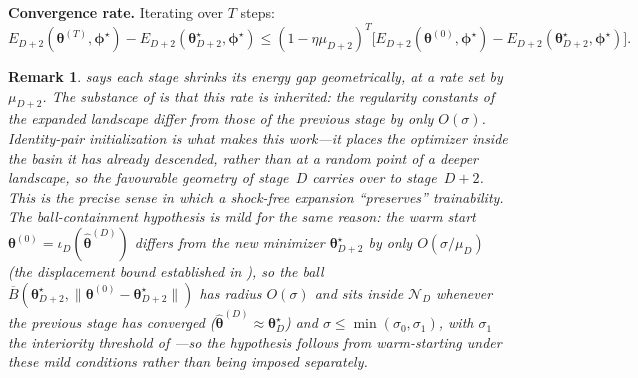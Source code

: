 \documentclass[11pt]{article}
\newcommand{\cN}{\mathcal{N}}
\theoremstyle{plain}
\theoremstyle{plain}
\newtheorem{remark}[theorem]{Remark}
\begin{document}
\medskip\noindent\textbf{Convergence rate.}
Iterating over $T$ steps:
\begin{equation}\label{eq:T_step_convergence}
  E_{D+2}(\bm\theta^{(T)},\bm\phi^\star)-E_{D+2}(\bm\theta_{D+2}^\star,\bm\phi^\star)
  \le(1-\eta\mu_{D+2})^T
   \bigl[E_{D+2}(\bm\theta^{(0)},\bm\phi^\star)-E_{D+2}(\bm\theta_{D+2}^\star,\bm\phi^\star)\bigr].
\end{equation}
\begin{remark}
 says each stage shrinks its energy gap
geometrically, at a rate set by $\mu_{D+2}$.  The substance of
 is that this rate is \emph{inherited}: the regularity
constants of the expanded landscape differ from those of the previous
stage by only $O(\sigma)$.  Identity-pair initialization is what makes
this work---it places the optimizer \emph{inside} the basin it has
already descended, rather than at a random point of a deeper landscape,
so the favourable geometry of stage~$D$ carries over to stage~$D{+}2$.
This is the precise sense in which a shock-free expansion ``preserves''
trainability.  The ball-containment hypothesis is mild for the same
reason: the warm start $\bm\theta^{(0)}=\iota_D(\hat{\bm\theta}^{(D)})$
differs from the new minimizer $\bm\theta_{D+2}^\star$ by only
$O(\sigma/\mu_D)$ (the displacement bound established in
), so the ball
$\overline{B}(\bm\theta_{D+2}^\star,\|\bm\theta^{(0)}-\bm\theta_{D+2}^\star\|)$
has radius $O(\sigma)$ and sits inside $\cN_D$ whenever the previous
stage has converged ($\hat{\bm\theta}^{(D)}\approx\bm\theta_D^\star$) and
$\sigma\le\min(\sigma_0,\sigma_1)$, with $\sigma_1$ the interiority threshold
of ---so the hypothesis follows from warm-starting
under these mild conditions rather than being imposed separately.
\end{remark}
\end{document}
